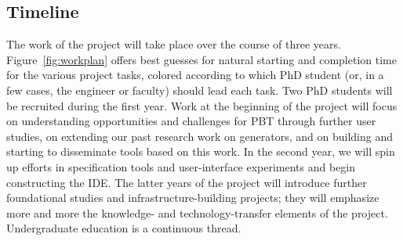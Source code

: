 \subsection*{Timeline}

The work of the project will take place over the course of three years.
Figure~\ref{fig:workplan} offers best guesses for natural starting and
completion time for the various project tasks, colored according to
which PhD student (or, in a few cases, the engineer or faculty) should
lead each task.
%
Two PhD students will be recruited during the first
year.  Work at the beginning
of the project will focus on understanding
opportunities and challenges for PBT through further user studies,
on extending
our past research work on generators, and on building and starting to
disseminate tools based on this work.  In the second year,
we will spin up efforts in specification tools and user-interface
experiments and begin constructing the \tyche{} IDE.  The latter years
of the project will introduce further foundational studies and
infrastructure-building projects; they will emphasize more and more the
knowledge- and technology-transfer elements of the project.
Undergraduate education is a continuous thread.




